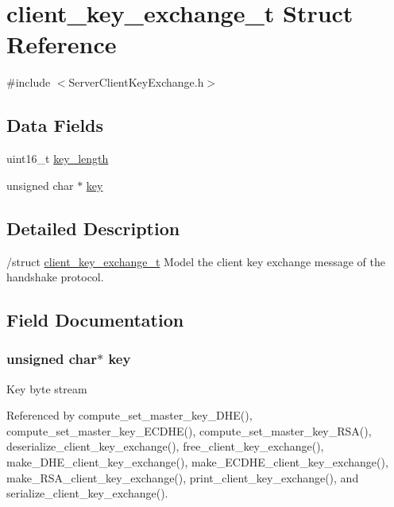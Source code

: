 \hypertarget{structclient__key__exchange__t}{}\section{client\+\_\+key\+\_\+exchange\+\_\+t Struct Reference}
\label{structclient__key__exchange__t}


{\ttfamily \#include $<$Server\+Client\+Key\+Exchange.\+h$>$}

\subsection*{Data Fields}
\begin{DoxyCompactItemize}
\item 
uint16\+\_\+t \hyperlink{structclient__key__exchange__t_aaca3c65525352f552124c3d947b60dcb}{key\+\_\+length}
\item 
unsigned char $\ast$ \hyperlink{structclient__key__exchange__t_a1cb5ee363f3d6d0f548eb6e64d72a7c8}{key}
\end{DoxyCompactItemize}


\subsection{Detailed Description}
/struct \hyperlink{structclient__key__exchange__t}{client\+\_\+key\+\_\+exchange\+\_\+t} Model the client key exchange message of the handshake protocol. 

\subsection{Field Documentation}
\subsubsection[{\texorpdfstring{key}{key}}]{\setlength{\rightskip}{0pt plus 5cm}unsigned char$\ast$ key}\hypertarget{structclient__key__exchange__t_a1cb5ee363f3d6d0f548eb6e64d72a7c8}{}\label{structclient__key__exchange__t_a1cb5ee363f3d6d0f548eb6e64d72a7c8}
Key byte stream 

Referenced by compute\+\_\+set\+\_\+master\+\_\+key\+\_\+\+D\+H\+E(), compute\+\_\+set\+\_\+master\+\_\+key\+\_\+\+E\+C\+D\+H\+E(), compute\+\_\+set\+\_\+master\+\_\+key\+\_\+\+R\+S\+A(), deserialize\+\_\+client\+\_\+key\+\_\+exchange(), free\+\_\+client\+\_\+key\+\_\+exchange(), make\+\_\+\+D\+H\+E\+\_\+client\+\_\+key\+\_\+exchange(), make\+\_\+\+E\+C\+D\+H\+E\+\_\+client\+\_\+key\+\_\+exchange(), make\+\_\+\+R\+S\+A\+\_\+client\+\_\+key\+\_\+exchange(), print\+\_\+client\+\_\+key\+\_\+exchange(), and serialize\+\_\+client\+\_\+key\+\_\+exchange().

